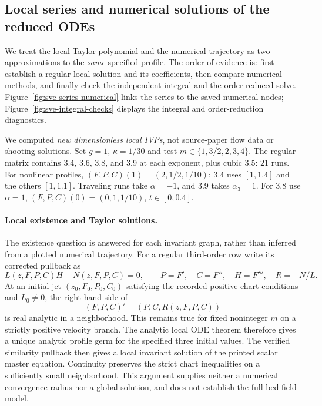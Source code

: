 \documentclass[11pt]{article}
\theoremstyle{definition}
\begin{document}
\subsection{Local series and numerical solutions of the reduced ODEs}
We treat the local Taylor polynomial and the numerical trajectory as two
approximations to the \emph{same} specified profile. The order of evidence is:
first establish a regular local solution and its coefficients, then compare
numerical methods, and finally check the independent integral and the
order-reduced solve. Figure~\ref{fig:sve-series-numerical} links the series to
the saved numerical nodes; Figure~\ref{fig:sve-integral-checks} displays the
integral and order-reduction diagnostics.

We computed \emph{new dimensionless local IVPs}, not source-paper flow data
or shooting solutions. Set $g=1$, $\kappa=1/30$ and test
$m\in\{1,3/2,2,3,4\}$. The regular matrix contains 3.4, 3.6, 3.8,
and 3.9 at each exponent, plus cubic 3.5: $21$ runs. For nonlinear
profiles, $(F,P,C)(1)=(2,1/2,1/10)$; 3.4 uses $[1,1.4]$ and the
others $[1,1.1]$. Traveling runs take $\alpha=-1$, and 3.9 takes
$\alpha_3=1$. For 3.8 use $\alpha=1$,
$(F,P,C)(0)=(0,1,1/10)$, $t\in[0,0.4]$.

\paragraph{Local existence and Taylor solutions.}
The existence question is answered for each invariant graph, rather than
inferred from a plotted numerical trajectory. For a regular third-order row
write its corrected pullback as
\[
 L(z,F,P,C)H+N(z,F,P,C)=0,\qquad
 P=F',\quad C=F'',\quad H=F''',\quad R=-N/L.
\]
At an initial jet $(z_0,F_0,P_0,C_0)$ satisfying the recorded positive-chart
conditions and $L_0\ne0$, the right-hand side of
\[
 (F,P,C)'=(P,C,R(z,F,P,C))
\]
is real analytic in a neighborhood. This remains true for fixed noninteger
$m$ on a strictly positive velocity branch. The analytic local ODE theorem
\cite[Section~4.1]{teschl2012}
therefore gives a unique analytic profile germ for the specified three
initial values. The verified similarity pullback then gives a local invariant
solution of the printed scalar master equation. Continuity preserves the
strict chart inequalities on a sufficiently small neighborhood. This
argument supplies neither a numerical convergence radius nor a global
solution, and does not establish the full bed-field model.
\end{document}
